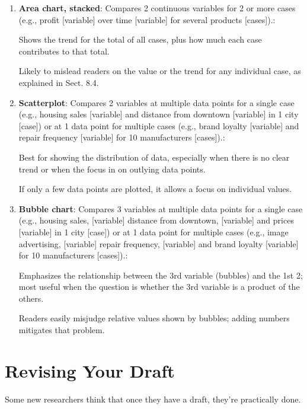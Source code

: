 \documentclass[oneside]{book}
\numberwithin{equation}{section}
\begin{document}
\begin{enumerate}
    Areas below the lines add no information and will lead some readers to misjudge values.
    
    Confusing with multiple lines/areas.
    \item \textbf{Area chart, stacked}: Compares 2 continuous variables for 2 or more cases (e.g., profit [variable] over time [variable] for several products [cases]).:
    
    Shows the trend for the total of all cases, plus how much each case contributes to that total.
    
    Likely to mislead readers on the value or the trend for any individual case, as explained in Sect. 8.4.
    \item \textbf{Scatterplot}: Compares 2 variables at multiple data points for a single case (e.g., housing sales [variable] and distance from downtown [variable] in 1 city [case]) or at 1 data point for multiple cases (e.g., brand loyalty [variable] and repair frequency [variable] for 10 manufacturers [cases]).:
    
    Best for showing the distribution of data, especially when there is no clear trend or when the focus in on outlying data points.
    
    If only a few data points are plotted, it allows a focus on individual values.
    \item \textbf{Bubble chart}: Compares 3 variables at multiple data points for a single case (e.g., housing sales, [variable] distance from downtown, [variable] and prices [variable] in 1 city [case]) or at 1 data point for multiple cases (e.g., image advertising, [variable] repair frequency, [variable] and brand loyalty [variable] for 10 manufacturers [cases]).:
    
    Emphasizes the relationship between the 3rd variable (bubbles) and the 1st 2; most useful when the question is whether the 3rd variable is a product of the others.
    
    Readers easily misjudge relative values shown by bubbles; adding numbers mitigates that problem.
\end{enumerate}


\chapter{Revising Your Draft}

Some new researchers think that once they have a draft, they're practically done.
\end{document}
